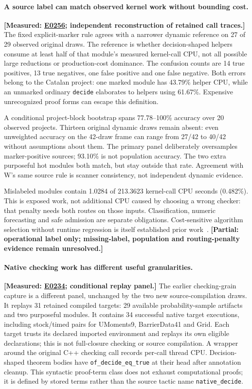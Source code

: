 \documentclass[10pt,twocolumn]{article}
\newcommand{\measured}[1]{\textbf{[Measured: #1]}}
\newcommand{\partialev}[1]{\textbf{[Partial: #1]}}
\newcommand{\expref}[2]{\href{https://github.com/yunwei37/proofserve/blob/main/docs/tmp/build-and-evaluate/step-#1/step-report.md}{E#2}}
\begin{document}
\paragraph{A source label can match observed kernel work without bounding cost.}
\measured{\expref{0256-20261101T205729+0000}{0256}; independent reconstruction of retained call traces.}
The fixed explicit-marker rule agrees with a narrower dynamic reference on
27 of 29 observed original draws. The reference is whether decision-shaped
helpers consume at least half of that module's measured kernel-call CPU,
not all possible large reductions or production-cost dominance.
The confusion counts are 14 true positives, 13 true negatives,
one false positive and one false negative.
Both errors belong to the Catalan project: one marked module has 43.79\%
helper CPU, while an unmarked ordinary \texttt{decide} elaborates to helpers
using 61.67\%. Expensive unrecognized proof forms can escape this definition.

A conditional project-block bootstrap spans 77.78--100\% accuracy over
20 observed projects. Thirteen original dynamic draws remain absent:
even unweighted accuracy on the 42-draw frame can range from 27/42 to
40/42 without assumptions about them. The primary panel deliberately
oversamples marker-positive sources; 93.10\% is not population accuracy.
The two extra purposeful hot modules both match, but stay outside that rate.
Agreement with W's same source rule is scanner consistency, not independent
dynamic evidence.

Mislabeled modules contain 1.0284 of 213.3623 kernel-call CPU seconds (0.482\%).
This is exposed work, not additional CPU caused by choosing a wrong checker:
that penalty needs both routes on those inputs.
Classification, numeric forecasting and safe admission are separate obligations.
Cost-sensitive algorithm selection without runtime regression is itself
established prior work~\cite{satzilla2012}.
\partialev{operational label only; missing-label, population and routing-penalty
evidence remain unresolved.}

\paragraph{Native checking work has different useful granularities.}
\measured{\expref{0234-20261101T030854+0000}{0234}; conditional replay panel.}
The earlier checking-grain capture is a different panel, unchanged by
the two new source-compilation draws. It replays 31 retained compiled targets:
29 available probability-sample artifacts and two purposeful modules.
It contains 34 successful native target executions, including stock/timed
pairs for UMoments9, BarrierData41 and Grid.
Each target trusts its declared imported environment and replays its own
eligible declarations; this is not full-closure checking or source compilation.
A wrapper around the original C++ checking call records per-call thread CPU.
Decision-shaped theorem bodies have \texttt{of\_decide\_eq\_true} at their
head after annotation cleanup. This syntactic proof-term class does not
exhaust computational proofs; it is defined by stored terms rather than the
source tactic name \texttt{native\_decide}.
\end{document}
